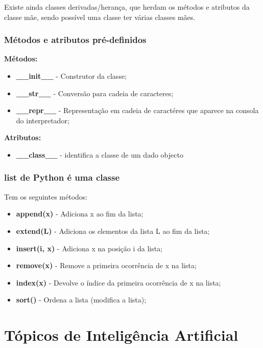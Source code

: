 \documentclass{article}
\begin{document}
Existe ainda classes derivadas/herança, que herdam os métodos e atributos da
classe mãe, sendo possível uma classe ter várias classes mães.

\pagebreak

\subsubsection{Métodos e atributos pré-definidos}

\begin{flushleft}
  \textbf{Métodos:}
  \begin{itemize}
    \item \textbf{\_\_init\_\_} - Construtor da classe;
    \item \textbf{\_\_str\_\_} - Conversão para cadeia de caracteres;
    \item \textbf{\_\_repr\_\_} - Representação em cadeia de caractéres
    que aparece na consola do interpretador;
  \end{itemize}

  \textbf{Atributos:}
  \begin{itemize}
    \item \textbf{\_\_class\_\_} - identifica a classe de um dado objecto
  \end{itemize}
\end{flushleft}

\subsubsection{list de Python é uma classe}

\begin{flushleft}
  Tem os seguintes métodos:
  \begin{itemize}
    \item \textbf{append(x)} - Adiciona x ao fim da lista;
    \item \textbf{extend(L)} - Adiciona os elementos da lista L ao fim da lista;
    \item \textbf{insert(i, x)} - Adiciona x na posição i da lista;
    \item \textbf{remove(x)} - Remove a primeira ocorrência de x na lista;
    \item \textbf{index(x)} - Devolve o índice da primeira ocorrência de x na lista;
    \item \textbf{sort()} - Ordena a lista (modifica a lista);
  \end{itemize}
\end{flushleft}

\section{Tópicos de Inteligência Artificial}
\end{document}
